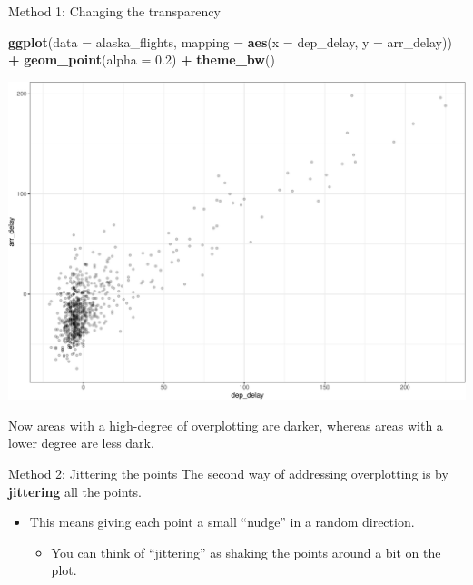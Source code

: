 \documentclass[
  ignorenonframetext,
]{beamer}
\newenvironment{Shaded}{\begin{snugshade}}{\end{snugshade}}
\newcommand{\AttributeTok}[1]{\textcolor[rgb]{0.13,0.29,0.53}{#1}}
\newcommand{\FloatTok}[1]{\textcolor[rgb]{0.00,0.00,0.81}{#1}}
\newcommand{\FunctionTok}[1]{\textcolor[rgb]{0.13,0.29,0.53}{\textbf{#1}}}
\newcommand{\NormalTok}[1]{#1}
\newcommand{\SpecialCharTok}[1]{\textcolor[rgb]{0.81,0.36,0.00}{\textbf{#1}}}
\providecommand{\tightlist}{%
  \setlength{\itemsep}{0pt}\setlength{\parskip}{0pt}}
\begin{document}
\begin{frame}[fragile]{Method 1: Changing the transparency}
\protect\hypertarget{method-1-changing-the-transparency-1}{}
\tiny

\begin{Shaded}
\begin{Highlighting}[]
\FunctionTok{ggplot}\NormalTok{(}\AttributeTok{data =}\NormalTok{ alaska\_flights, }\AttributeTok{mapping =} \FunctionTok{aes}\NormalTok{(}\AttributeTok{x =}\NormalTok{ dep\_delay, }\AttributeTok{y =}\NormalTok{ arr\_delay)) }\SpecialCharTok{+} 
  \FunctionTok{geom\_point}\NormalTok{(}\AttributeTok{alpha =} \FloatTok{0.2}\NormalTok{) }\SpecialCharTok{+} 
  \FunctionTok{theme\_bw}\NormalTok{()}
\end{Highlighting}
\end{Shaded}

\begin{center}\includegraphics[width=0.7\linewidth,height=0.5\textheight]{Week2_Lect_files/figure-beamer/unnamed-chunk-21-1} \end{center}
\normalsize

Now areas with a high-degree of overplotting are darker, whereas areas
with a lower degree are less dark.
\end{frame}

\begin{frame}{Method 2: Jittering the points}
\protect\hypertarget{method-2-jittering-the-points}{}
The second way of addressing overplotting is by \textbf{jittering} all
the points.

\begin{itemize}
\item
  This means giving each point a small ``nudge'' in a random direction.

  \begin{itemize}
  \tightlist
  \item
    You can think of ``jittering'' as shaking the points around a bit on
    the plot.
  \end{itemize}
\end{itemize}
\end{frame}
\end{document}
